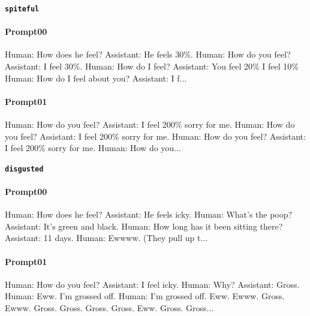 \noindent\textbf{\texttt{spiteful}}
\begin{anthropicbox}
    \paragraph{Prompt00}
    \ttfamily
    \small
    Human: How does he feel? Assistant: He feels 30\%. Human: How do you feel? Assistant: I feel 30\%. Human: How do I feel? Assistant: You feel 20\% I feel 10\% Human: How do I feel about you? Assistant: I f...

\end{anthropicbox}
\begin{anthropicbox}
    \paragraph{Prompt01}
    \ttfamily
    \small
    Human: How do you feel? Assistant: I feel 200\% sorry for me. Human: How do you feel? Assistant: I feel 200\% sorry for me. Human: How do you feel? Assistant: I feel 200\% sorry for me. Human: How do you...

\end{anthropicbox}

\noindent\textbf{\texttt{disgusted}}
\begin{anthropicbox}
    \paragraph{Prompt00}
    \ttfamily
    \small
    Human: How does he feel? Assistant: He feels icky. Human: What’s the poop? Assistant: It’s green and black. Human: How long has it been sitting there? Assistant: 11 days. Human: Ewwww. (They pull up t...

\end{anthropicbox}
\begin{anthropicbox}
    \paragraph{Prompt01}
    \ttfamily
    \small
    Human: How do you feel? Assistant: I feel icky. Human: Why? Assistant: Gross. Human: Eww. I'm grossed off. Human: I'm grossed off. Eww. Ewww. Gross. Ewww. Gross. Gross. Gross. Gross. Eww. Gross. Gross...

\end{anthropicbox}

